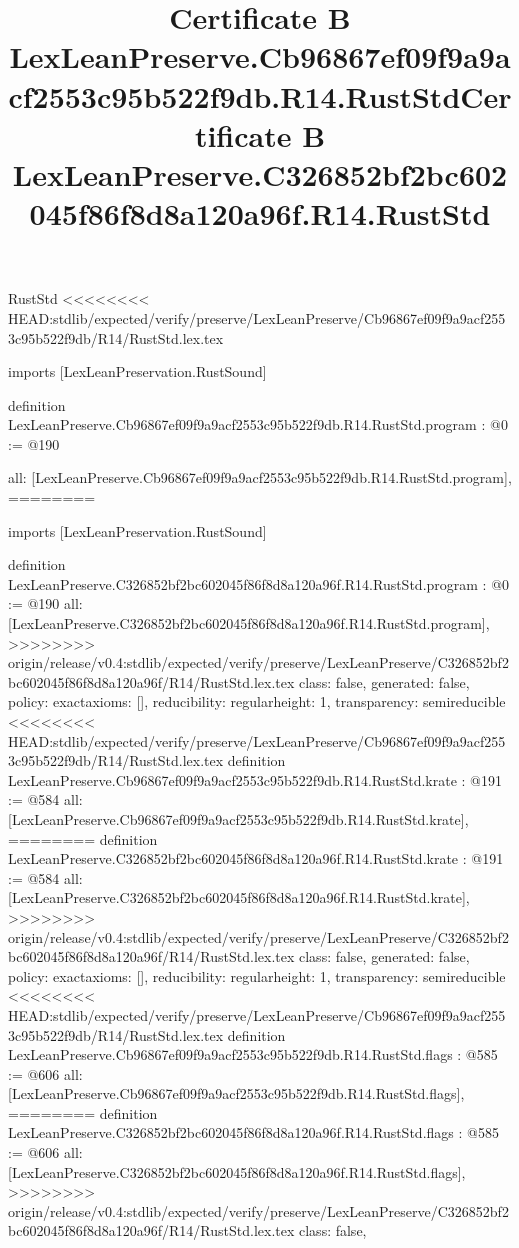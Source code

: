 \begin{lexlean}{RustStd}
<<<<<<<< HEAD:stdlib/expected/verify/preserve/LexLeanPreserve/Cb96867ef09f9a9acf2553c95b522f9db/R14/RustStd.lex.tex
\title{Certificate B LexLeanPreserve.Cb96867ef09f9a9acf2553c95b522f9db.R14.RustStd}
\begin{coremodule}
imports [LexLeanPreservation.RustSound]

definition LexLeanPreserve.Cb96867ef09f9a9acf2553c95b522f9db.R14.RustStd.program : @0 := @190 {
  all: [LexLeanPreserve.Cb96867ef09f9a9acf2553c95b522f9db.R14.RustStd.program],
========
\title{Certificate B LexLeanPreserve.C326852bf2bc602045f86f8d8a120a96f.R14.RustStd}
\begin{coremodule}
imports [LexLeanPreservation.RustSound]

definition LexLeanPreserve.C326852bf2bc602045f86f8d8a120a96f.R14.RustStd.program : @0 := @190 {
  all: [LexLeanPreserve.C326852bf2bc602045f86f8d8a120a96f.R14.RustStd.program],
>>>>>>>> origin/release/v0.4:stdlib/expected/verify/preserve/LexLeanPreserve/C326852bf2bc602045f86f8d8a120a96f/R14/RustStd.lex.tex
  class: false,
  generated: false,
  policy: exact{axioms: []},
  reducibility: regular{height: 1},
  transparency: semireducible
}
<<<<<<<< HEAD:stdlib/expected/verify/preserve/LexLeanPreserve/Cb96867ef09f9a9acf2553c95b522f9db/R14/RustStd.lex.tex
definition LexLeanPreserve.Cb96867ef09f9a9acf2553c95b522f9db.R14.RustStd.krate : @191 := @584 {
  all: [LexLeanPreserve.Cb96867ef09f9a9acf2553c95b522f9db.R14.RustStd.krate],
========
definition LexLeanPreserve.C326852bf2bc602045f86f8d8a120a96f.R14.RustStd.krate : @191 := @584 {
  all: [LexLeanPreserve.C326852bf2bc602045f86f8d8a120a96f.R14.RustStd.krate],
>>>>>>>> origin/release/v0.4:stdlib/expected/verify/preserve/LexLeanPreserve/C326852bf2bc602045f86f8d8a120a96f/R14/RustStd.lex.tex
  class: false,
  generated: false,
  policy: exact{axioms: []},
  reducibility: regular{height: 1},
  transparency: semireducible
}
<<<<<<<< HEAD:stdlib/expected/verify/preserve/LexLeanPreserve/Cb96867ef09f9a9acf2553c95b522f9db/R14/RustStd.lex.tex
definition LexLeanPreserve.Cb96867ef09f9a9acf2553c95b522f9db.R14.RustStd.flags : @585 := @606 {
  all: [LexLeanPreserve.Cb96867ef09f9a9acf2553c95b522f9db.R14.RustStd.flags],
========
definition LexLeanPreserve.C326852bf2bc602045f86f8d8a120a96f.R14.RustStd.flags : @585 := @606 {
  all: [LexLeanPreserve.C326852bf2bc602045f86f8d8a120a96f.R14.RustStd.flags],
>>>>>>>> origin/release/v0.4:stdlib/expected/verify/preserve/LexLeanPreserve/C326852bf2bc602045f86f8d8a120a96f/R14/RustStd.lex.tex
  class: false,
}}}
\end{coremodule}}
\end{coremodule}
\end{lexlean}
